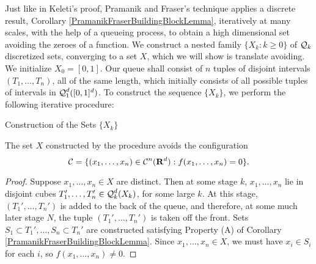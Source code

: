 Just like in Keleti's proof, Pramanik and Fraser's technique applies a discrete result, Corollary \ref{PramanikFraserBuildingBlockLemma}, iteratively at many scales, with the help of a queueing process, to obtain a high dimensional set avoiding the zeroes of a function. We construct a nested family $\{ X_k : k \geq 0 \}$ of $\operatorname{\mathcal{Q}}_k$ discretized sets, converging to a set $X$, which we will show is translate avoiding. We initialize $X_0 = [0,1]$. Our queue shall consist of $n$ tuples of disjoint intervals $(T_1, \dots, T_n)$, all of the same length, which initially consists of all possible tuples of intervals in $\operatorname{\mathcal{Q}}_1^d([0,1]^d)$. To construct the sequence $\{ X_k \}$, we perform the following iterative procedure:
%
\begin{algorithm}[H]
    \begin{algorithmic}
        \caption{Construction of the Sets $\{ X_k \}$}
        \MRepeat
        \EndRepeat   
    \end{algorithmic}
\end{algorithm}

\begin{lemma}
    The set $X$ constructed by the procedure avoids the configuration
    \[ \operatorname{\mathcal{C}} = \{ (x_1, \dots, x_n) \in \operatorname{\mathcal{C}}^n(\operatorname{\mathbf{R}}^d) : f(x_1, \dots, x_n) = 0 \}. \]
\end{lemma}
\begin{proof}
    Suppose $x_1, \dots, x_n \in X$ are distinct. Then at some stage $k$, $x_1, \dots, x_n$ lie in disjoint cubes $T_1', \dots, T_n' \in \operatorname{\mathcal{Q}}_k^d(X_k)$, for some large $k$. At this stage, $(T_1', \dots, T_n')$ is added to the back of the queue, and therefore, at some much later stage $N$, the tuple $(T_1', \dots, T_n')$ is taken off the front. Sets $S_1 \subset T_1', \dots, S_n \subset T_n'$ are constructed satisfying Property (A) of Corollary \ref{PramanikFraserBuildingBlockLemma}. Since $x_1, \dots, x_n \in X$, we must have $x_i \in S_i$ for each $i$, so $f(x_1, \dots, x_n) \neq 0$.
\end{proof}

